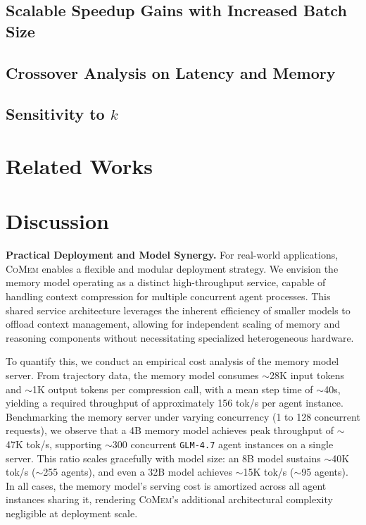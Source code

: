 \documentclass{article}
\theoremstyle{plain}
\theoremstyle{definition}
\theoremstyle{remark}
\newcommand{\model}{\textsc{CoMem}\xspace}
\begin{document}
\subsection{Scalable Speedup Gains with Increased Batch Size}\label{sec:batch_size}


\subsection{Crossover Analysis on Latency and Memory}\label{sec:crossover}


\subsection{Sensitivity to $k$}\label{sec:k_sensitivity}


\section{Related Works}


\section{Discussion}\label{sec:discuss}

\textbf{Practical Deployment and Model Synergy.} For real-world applications, {\model} enables a flexible and modular deployment strategy. We envision the memory model operating as a distinct high-throughput service, capable of handling context compression for multiple concurrent agent processes. This shared service architecture leverages the inherent efficiency of smaller models to offload context management, allowing for independent scaling of memory and reasoning components without necessitating specialized heterogeneous hardware.

To quantify this, we conduct an empirical cost analysis of the memory model server. From trajectory data, the memory model consumes $\sim$28K input tokens and $\sim$1K output tokens per compression call, with a mean step time of $\sim$40s, yielding a required throughput of approximately 156 tok/s per agent instance. Benchmarking the memory server under varying concurrency (1 to 128 concurrent requests), we observe that a 4B memory model achieves peak throughput of $\sim$47K tok/s, supporting $\sim$300 concurrent \texttt{GLM-4.7} agent instances on a single server. This ratio scales gracefully with model size: an 8B model sustains $\sim$40K tok/s ($\sim$255 agents), and even a 32B model achieves $\sim$15K tok/s ($\sim$95 agents). In all cases, the memory model's serving cost is amortized across all agent instances sharing it, rendering {\model}'s additional architectural complexity negligible at deployment scale.
\end{document}
